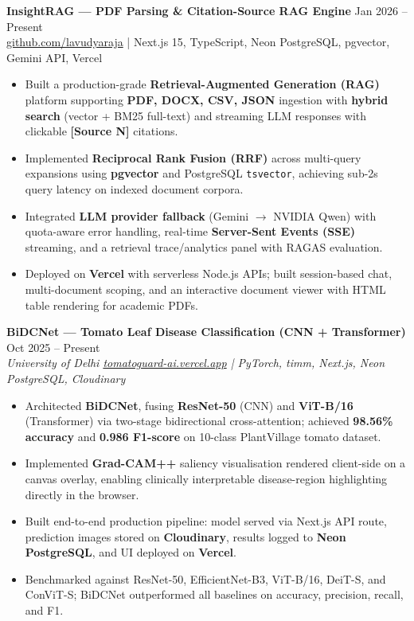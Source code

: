 \documentclass[11pt,letterpaper]{article}
\begin{document}
\textbf{InsightRAG --- PDF Parsing \& Citation-Source RAG Engine} \hfill Jan 2026 -- Present \\
\href{https://github.com/lavudyaraja}{github.com/lavudyaraja} \;|\; Next.js 15, TypeScript, Neon PostgreSQL, pgvector, Gemini API, Vercel
\begin{itemize}
  \item Built a production-grade \textbf{Retrieval-Augmented Generation (RAG)} platform supporting \textbf{PDF, DOCX, CSV, JSON} ingestion with \textbf{hybrid search} (vector + BM25 full-text) and streaming LLM responses with clickable \textbf{[Source N]} citations.
  \item Implemented \textbf{Reciprocal Rank Fusion (RRF)} across multi-query expansions using \textbf{pgvector} and PostgreSQL \texttt{tsvector}, achieving sub-2s query latency on indexed document corpora.
  \item Integrated \textbf{LLM provider fallback} (Gemini $\rightarrow$ NVIDIA Qwen) with quota-aware error handling, real-time \textbf{Server-Sent Events (SSE)} streaming, and a retrieval trace/analytics panel with RAGAS evaluation.
  \item Deployed on \textbf{Vercel} with serverless Node.js APIs; built session-based chat, multi-document scoping, and an interactive document viewer with HTML table rendering for academic PDFs.
\end{itemize}

\vspace{4pt}
\textbf{BiDCNet --- Tomato Leaf Disease Classification (CNN + Transformer)} \hfill Oct 2025 -- Present \\
\textit{University of Delhi \textbar{} \href{https://tomatoguard-ai.vercel.app}{tomatoguard-ai.vercel.app} \;|\; PyTorch, timm, Next.js, Neon PostgreSQL, Cloudinary}
\begin{itemize}
  \item Architected \textbf{BiDCNet}, fusing \textbf{ResNet-50} (CNN) and \textbf{ViT-B/16} (Transformer) via two-stage bidirectional cross-attention; achieved \textbf{98.56\% accuracy} and \textbf{0.986 F1-score} on 10-class PlantVillage tomato dataset.
  \item Implemented \textbf{Grad-CAM++} saliency visualisation rendered client-side on a canvas overlay, enabling clinically interpretable disease-region highlighting directly in the browser.
  \item Built end-to-end production pipeline: model served via Next.js API route, prediction images stored on \textbf{Cloudinary}, results logged to \textbf{Neon PostgreSQL}, and UI deployed on \textbf{Vercel}.
  \item Benchmarked against ResNet-50, EfficientNet-B3, ViT-B/16, DeiT-S, and ConViT-S; BiDCNet outperformed all baselines on accuracy, precision, recall, and F1.
\end{itemize}
\end{document}
